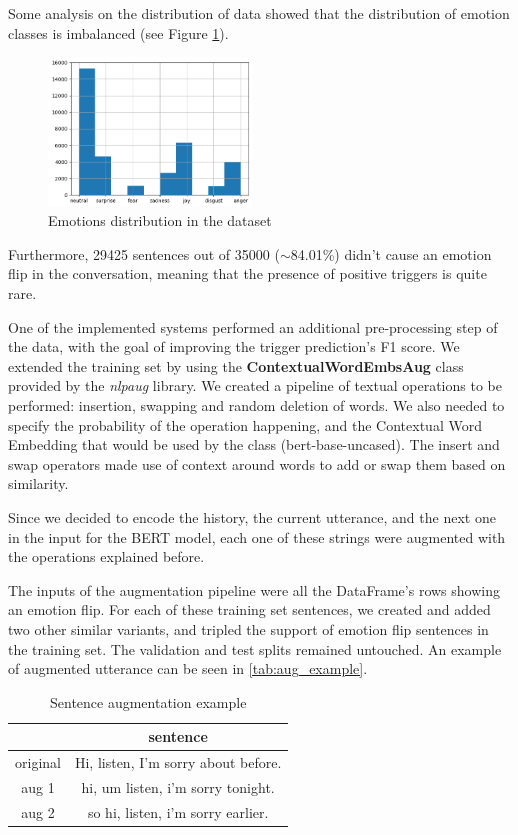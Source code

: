 \documentclass[11pt,table,xcdraw]{article}
\begin{document}
Some analysis on the distribution of data showed that the distribution of emotion classes is imbalanced (see Figure \ref{fig:em_dist}). 
\begin{figure}[]
    \centering
    \includegraphics[width=0.48\textwidth]{img/em_dist.png}
    \caption{Emotions distribution in the dataset}
    \label{fig:em_dist}
    \centering
\end{figure}
Furthermore, 29425 sentences out of 35000 ($\sim$84.01\%) didn't cause an emotion flip in the conversation, meaning that the presence of positive triggers is quite rare.

One of the implemented systems performed an additional pre-processing step of the data, with the goal of improving the trigger prediction's F1 score. We extended the training set by using the \textbf{ContextualWordEmbsAug} class provided by the \textit{nlpaug} library. We created a pipeline of textual operations to be performed: insertion, swapping and random deletion of words. We also needed to specify the probability of the operation happening, and the Contextual Word Embedding that would be used by the class (bert-base-uncased). The insert and swap operators made use of context around words to add or swap them based on similarity.

Since we decided to encode the history, the current utterance, and the next one in the input for the BERT model, each one of these strings were augmented with the operations explained before.

The inputs of the augmentation pipeline were all the DataFrame's rows showing an emotion flip. For each of these training set sentences, we created and added two other similar variants, and tripled the support of emotion flip sentences in the training set. The validation and test splits remained untouched. An example of augmented utterance can be seen in  \autoref{tab:aug_example}.

\begin{table}[h]
    \centering
    \caption{Sentence augmentation example}
    \label{tab:aug_example}
    \begin{tabular}{|c|c|}
    \hline
    & sentence \\
    \hline
    original & Hi, listen, I'm sorry about before. \\
    aug 1 & hi, um listen, i'm sorry tonight. \\
    aug 2 & so hi, listen, i'm sorry earlier. \\
    \hline
    \end{tabular}
\end{table}
\end{document}
